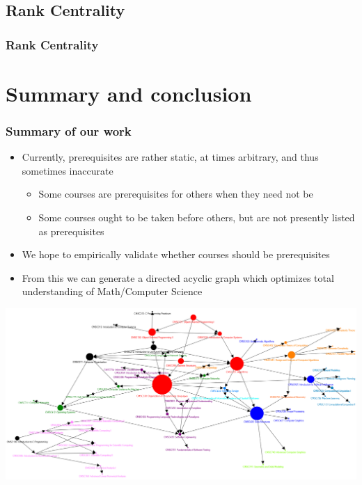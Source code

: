 \documentclass{beamer}
\begin{document}
\subsection{Rank Centrality}
\begin{frame}
     \frametitle{Rank Centrality}
\end{frame}

\section{Summary and conclusion}  \label{sec:conclusion}

\begin{frame}
\frametitle{Summary of our work}
\begin{itemize}
\item Currently, prerequisites are rather static, at times arbitrary, and thus sometimes inaccurate 
\begin{itemize}
\item Some courses are prerequisites for others when they need not be
\item Some courses ought to be taken before others, but are not presently listed as prerequisites
\end{itemize}
\item We hope to empirically validate whether courses should be prerequisites
\item From this we can generate a directed acyclic graph which optimizes total understanding of Math/Computer Science
\end{itemize} 
\centerline{\includegraphics[width=0.76\columnwidth]{dag.png}}
\end{frame}
\end{document}
